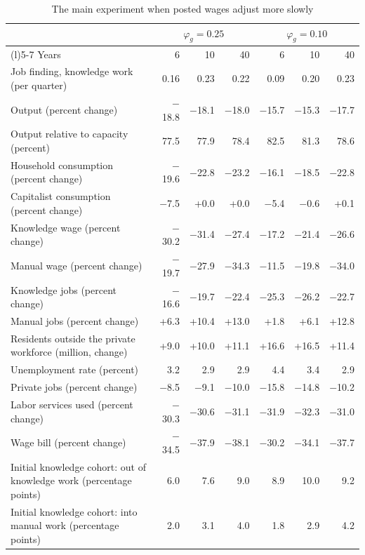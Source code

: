 \begin{table}[htbp]\centering\small
\caption{The main experiment when posted wages adjust more slowly}\label{tab:wagespeed}
\begin{tabularx}{\linewidth}{@{}>{\raggedright\arraybackslash}Xrrrrrr@{}}\toprule
 & \multicolumn{3}{c}{$\varphi_g=0.25$} & \multicolumn{3}{c}{$\varphi_g=0.10$} \\\cmidrule(lr){2-4}\cmidrule(l){5-7}
Years & 6 & 10 & 40 & 6 & 10 & 40 \\
\midrule Job finding, knowledge work (per quarter) & 0.16 & 0.23 & 0.22 & 0.09 & 0.20 & 0.23 \\
Output (percent change) & $-$18.8 & $-$18.1 & $-$18.0 & $-$15.7 & $-$15.3 & $-$17.7 \\
Output relative to capacity (percent) & 77.5 & 77.9 & 78.4 & 82.5 & 81.3 & 78.6 \\
Household consumption (percent change) & $-$19.6 & $-$22.8 & $-$23.2 & $-$16.1 & $-$18.5 & $-$22.8 \\
Capitalist consumption (percent change) & $-$7.5 & +0.0 & +0.0 & $-$5.4 & $-$0.6 & +0.1 \\
Knowledge wage (percent change) & $-$30.2 & $-$31.4 & $-$27.4 & $-$17.2 & $-$21.4 & $-$26.6 \\
Manual wage (percent change) & $-$19.7 & $-$27.9 & $-$34.3 & $-$11.5 & $-$19.8 & $-$34.0 \\
Knowledge jobs (percent change) & $-$16.6 & $-$19.7 & $-$22.4 & $-$25.3 & $-$26.2 & $-$22.7 \\
Manual jobs (percent change) & +6.3 & +10.4 & +13.0 & +1.8 & +6.1 & +12.8 \\
Residents outside the private workforce (million, change) & +9.0 & +10.0 & +11.1 & +16.6 & +16.5 & +11.4 \\
Unemployment rate (percent) & 3.2 & 2.9 & 2.9 & 4.4 & 3.4 & 2.9 \\
Private jobs (percent change) & $-$8.5 & $-$9.1 & $-$10.0 & $-$15.8 & $-$14.8 & $-$10.2 \\
Labor services used (percent change) & $-$30.3 & $-$30.6 & $-$31.1 & $-$31.9 & $-$32.3 & $-$31.0 \\
Wage bill (percent change) & $-$34.5 & $-$37.9 & $-$38.1 & $-$30.2 & $-$34.1 & $-$37.7 \\
Initial knowledge cohort: out of knowledge work (percentage points) & 6.0 & 7.6 & 9.0 & 8.9 & 10.0 & 9.2 \\
Initial knowledge cohort: into manual work (percentage points) & 2.0 & 3.1 & 4.0 & 1.8 & 2.9 & 4.2 \\

\end{tabularx}
\end{table}
